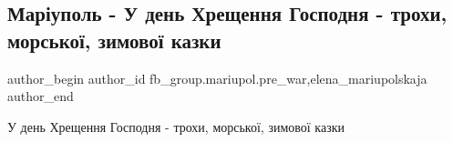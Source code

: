  
 
 
 
 

\subsection{Маріуполь - У день Хрещення Господня - трохи, морської, зимової казки}
\label{sec:20_01_2023.fb.fb_group.mariupol.pre_war.5.mar_upol___u_den_khr}
 
\ifcmt
 author_begin
   author_id fb_group.mariupol.pre_war,elena_mariupolskaja
 author_end
\fi

У день Хрещення Господня - трохи, морської, зимової казки
